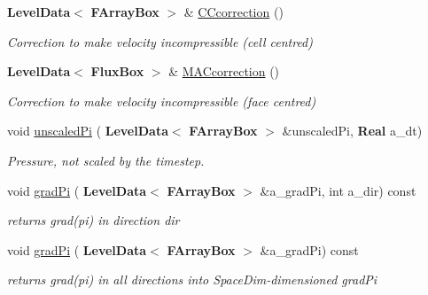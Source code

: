 \begin{DoxyCompactItemize}
\textbf{ Level\+Data}$<$ \textbf{ F\+Array\+Box} $>$ \& \hyperlink{class_projector_a65dfc7e4b02b93b2f7783754998bf4ee}{C\+Ccorrection} ()
\begin{DoxyCompactList}\small\item\em Correction to make velocity incompressible (cell centred) \end{DoxyCompactList}\item 
\mbox{\label{class_projector_a423fff791b15dd42aec0d9fb11efd07f}} 
\textbf{ Level\+Data}$<$ \textbf{ Flux\+Box} $>$ \& \hyperlink{class_projector_a423fff791b15dd42aec0d9fb11efd07f}{M\+A\+Ccorrection} ()
\begin{DoxyCompactList}\small\item\em Correction to make velocity incompressible (face centred) \end{DoxyCompactList}\item 
\mbox{\label{class_projector_a5114f784e55ecec7882484ccfd1665a4}} 
void \hyperlink{class_projector_a5114f784e55ecec7882484ccfd1665a4}{unscaled\+Pi} (\textbf{ Level\+Data}$<$ \textbf{ F\+Array\+Box} $>$ \&unscaled\+Pi, \textbf{ Real} a\+\_\+dt)
\begin{DoxyCompactList}\small\item\em Pressure, not scaled by the timestep. \end{DoxyCompactList}\item 
\mbox{\label{class_projector_a6bdb37a30d9a472538e02a195dd85ac8}} 
void \hyperlink{class_projector_a6bdb37a30d9a472538e02a195dd85ac8}{grad\+Pi} (\textbf{ Level\+Data}$<$ \textbf{ F\+Array\+Box} $>$ \&a\+\_\+grad\+Pi, int a\+\_\+dir) const
\begin{DoxyCompactList}\small\item\em returns grad(pi) in direction dir \end{DoxyCompactList}\item 
\mbox{\label{class_projector_a23b6f27c830c31f78add1fa11a65d0af}} 
void \hyperlink{class_projector_a23b6f27c830c31f78add1fa11a65d0af}{grad\+Pi} (\textbf{ Level\+Data}$<$ \textbf{ F\+Array\+Box} $>$ \&a\+\_\+grad\+Pi) const
\begin{DoxyCompactList}\small\item\em returns grad(pi) in all directions into Space\+Dim-\/dimensioned grad\+Pi \end{DoxyCompactList}\item 

\end{DoxyCompactItemize}
